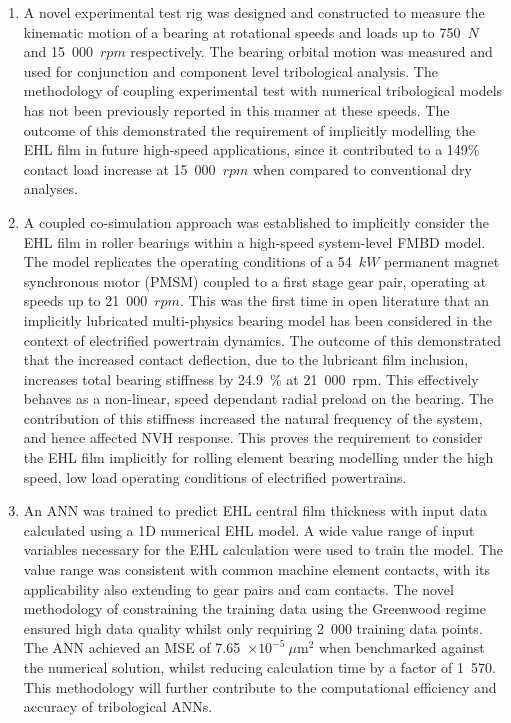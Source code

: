 \begin{enumerate}
	\item A novel experimental test rig was designed and constructed to measure the kinematic motion of a bearing at rotational speeds and loads up to 750~$N$ and 15~000~$rpm$ respectively. The bearing orbital motion was measured and used for conjunction and component level tribological analysis. The methodology of coupling experimental test with numerical tribological models has not been previously reported in this manner at these speeds. The outcome of this demonstrated the requirement of implicitly modelling the EHL film in future high-speed applications, since it contributed to a 149\% contact load increase at 15~000~$rpm$ when compared to conventional dry analyses.
	
	\item A coupled co-simulation approach was established to implicitly consider the EHL film in roller bearings within a high-speed system-level FMBD model. The model replicates the operating conditions of a 54~$kW$ permanent magnet synchronous motor (PMSM) coupled to a first stage gear pair, operating at speeds up to 21~000~$rpm$. This was the first time in open literature that an implicitly lubricated multi-physics bearing model has been considered in the context of electrified powertrain dynamics. The outcome of this demonstrated that the increased contact deflection, due to the lubricant film inclusion, increases total bearing stiffness by 24.9~\% at 21~000~rpm. This effectively behaves as a non-linear, speed dependant radial preload on the bearing. The contribution of this stiffness increased the natural frequency of the system, and hence affected NVH response. This proves the requirement to consider the EHL film implicitly for rolling element bearing modelling under the high speed, low load operating conditions of electrified powertrains.
	
	\item An ANN was trained to predict EHL central film thickness with input data calculated using a 1D numerical EHL model. A wide value range of input variables necessary for the EHL calculation were used to train the model. The value range was consistent with common machine element contacts, with its applicability also extending to gear pairs and cam contacts. The novel methodology of constraining the training data using the Greenwood regime ensured high data quality whilst only requiring 2~000 training data points. The ANN achieved an MSE of 7.65~$\times 10^{-5}~\mu \mathrm{m}^2$ when benchmarked against the numerical solution, whilst reducing calculation time by a factor of 1~570. This methodology will further contribute to the computational efficiency and accuracy of tribological ANNs.
	

\end{enumerate}

